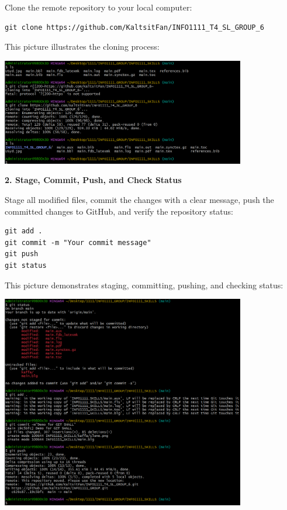 \documentclass[a4paper, 11pt]{report}
\begin{document}
Clone the remote repository to your local computer:
\begin{verbatim}
git clone https://github.com/KaltsitFan/INFO1111_T4_SL_GROUP_6
\end{verbatim}

This picture illustrates the cloning process:

\begin{center}
\includegraphics[width=0.8\textwidth]{kaffa/clone.png}
\end{center}

\textbf{2. Stage, Commit, Push, and Check Status}

Stage all modified files, commit the changes with a clear message, push the committed changes to GitHub, and verify the repository status:

\begin{verbatim}
git add .
git commit -m "Your commit message"
git push
git status
\end{verbatim}

This picture demonstrates staging, committing, pushing, and checking status:

\begin{center}
\includegraphics[width=0.8\textwidth]{kaffa/push.png}
\end{center}
\end{document}
